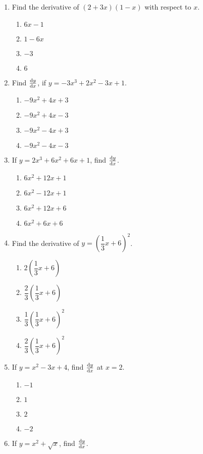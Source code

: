 \begin{multicols}{2}
\begin{enumerate}[label={\arabic*.}]
\item Find the derivative of \((2+3x)(1-x)\) with respect to \(x\).
\begin{enumerate}[label={\Alph*.}]
\item \(6x-1\)
\item \(1-6x\)
\item \(-3\)
\item \(6\)
\end{enumerate}
\item Find \(\dv{y}{x}\), if \(y = -3{x}^{3}+2{x}^{2}-3x+1\).
\begin{enumerate}[label={\Alph*.}]
\item \(-9{x}^{2}+4{x}+3\)
\item \(-9{x}^{2}+4{x}-3\)
\item \(-9{x}^{2}-4{x}+3\)
\item \(-9{x}^{2}-4{x}-3\)
\end{enumerate}
\item If \(y = 2{x}^{3}+6{x}^{2}+6x+1\), find \(\dv{y}{x}\).
\begin{enumerate}[label={\Alph*.}]
\item \(6{x}^{2}+12{x}+1\)
\item \(6{x}^{2}-12{x}+1\)
\item \(6{x}^{2}+12{x}+6\)
\item \(6{x}^{2}+6{x}+6\)
\end{enumerate}
\item Find the derivative of \(y ={\left(\dfrac{1}{3}x + 6\right)}^{2}\).
\begin{enumerate}[label={\Alph*.}]
\item \(2{\left(\dfrac{1}{3}x + 6\right)}\)
\item \(\dfrac{2}{3}{\left(\dfrac{1}{3}x + 6\right)}\)
\item \(\dfrac{1}{3}{\left(\dfrac{1}{3}x + 6\right)}^{2}\)
\item \(\dfrac{2}{3}{\left(\dfrac{1}{3}x + 6\right)}^{2}\)
\end{enumerate}
\item If \(y = {x}^{2}-3{x}+4\), find \(\dv{y}{x}\) at \(x = 2\).
\begin{enumerate}[label={\Alph*.}]
\item \(-1\)
\item \(1\)
\item \(2\)
\item \(-2\)
\end{enumerate}
\item If  \(y = {x}^{2}+\sqrt{x}\), find \(\dv{y}{x}\).

\end{enumerate}
\end{multicols}
